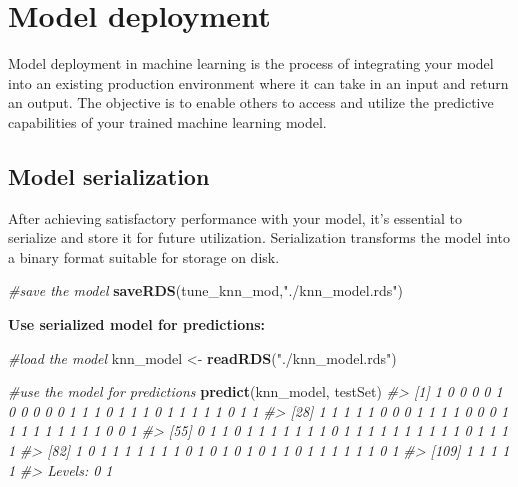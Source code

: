 \documentclass[
]{book}
\newenvironment{Shaded}{\begin{snugshade}}{\end{snugshade}}
\newcommand{\CommentTok}[1]{\textcolor[rgb]{0.56,0.35,0.01}{\textit{#1}}}
\newcommand{\FunctionTok}[1]{\textcolor[rgb]{0.13,0.29,0.53}{\textbf{#1}}}
\newcommand{\NormalTok}[1]{#1}
\newcommand{\OtherTok}[1]{\textcolor[rgb]{0.56,0.35,0.01}{#1}}
\newcommand{\StringTok}[1]{\textcolor[rgb]{0.31,0.60,0.02}{#1}}
\begin{document}
\hypertarget{model-deployment}{%
\chapter{Model deployment}\label{model-deployment}}

Model deployment in machine learning is the process of integrating your model into an existing production environment where it can take in an input and return an output. The objective is to enable others to access and utilize the predictive capabilities of your trained machine learning model.

\hypertarget{model-serialization}{%
\section{Model serialization}\label{model-serialization}}

After achieving satisfactory performance with your model, it's essential to serialize and store it for future utilization. Serialization transforms the model into a binary format suitable for storage on disk.

\begin{Shaded}
\begin{Highlighting}[]
\CommentTok{\#save the model}
\FunctionTok{saveRDS}\NormalTok{(tune\_knn\_mod,}\StringTok{"./knn\_model.rds"}\NormalTok{)}
\end{Highlighting}
\end{Shaded}

\textbf{Use serialized model for predictions:}

\begin{Shaded}
\begin{Highlighting}[]
\CommentTok{\#load the model}
\NormalTok{knn\_model }\OtherTok{\textless{}{-}} \FunctionTok{readRDS}\NormalTok{(}\StringTok{"./knn\_model.rds"}\NormalTok{)}

\CommentTok{\#use the model for predictions}
\FunctionTok{predict}\NormalTok{(knn\_model, testSet)}
\CommentTok{\#\textgreater{}   [1] 1 0 0 0 0 1 0 0 0 0 0 1 1 1 0 1 1 1 0 1 1 1 1 1 0 1 1}
\CommentTok{\#\textgreater{}  [28] 1 1 1 1 1 0 0 0 1 1 1 1 0 0 0 1 1 1 1 1 1 1 1 1 0 0 1}
\CommentTok{\#\textgreater{}  [55] 0 1 1 0 1 1 1 1 1 1 1 0 1 1 1 1 1 1 1 1 1 1 0 1 1 1 1}
\CommentTok{\#\textgreater{}  [82] 1 0 1 1 1 1 1 1 1 0 1 0 1 0 1 0 1 1 0 1 1 1 1 1 1 0 1}
\CommentTok{\#\textgreater{} [109] 1 1 1 1 1}
\CommentTok{\#\textgreater{} Levels: 0 1}
\end{Highlighting}
\end{Shaded}
\end{document}
